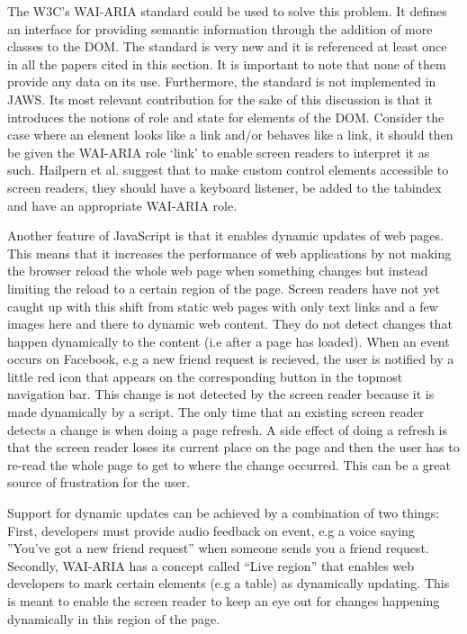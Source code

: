 \documentclass[conference]{IEEEtran}
\begin{document}
The W3C’s WAI-ARIA standard\cite{ariaspec} could be used to solve this
problem\cite{ariaprimer}.  It defines an interface for providing semantic
information through the addition of more classes to the DOM.  The standard is
very new and it is referenced at least once in all the papers cited in this
section. It is important to note that none of them provide any data on its use.
Furthermore, the standard  is not implemented in JAWS\cite{hailpern2009}.  Its
most relevant contribution for the sake of this discussion is that it
introduces the notions of role and state for elements of the DOM.  Consider the
case where an element looks like a link and/or behaves like a link, it should
then be given the WAI-ARIA role `link' to enable screen readers to interpret it
as such.  Hailpern et al\cite{hailpern2009}.  suggest that to make custom control
elements accessible to screen readers, they should have a keyboard listener, be
added to the tabindex and have an appropriate WAI-ARIA role.

Another feature of JavaScript is that it  enables dynamic updates of web pages.
This means that it increases the performance of web applications by not making
the browser reload the whole web page when something changes but instead
limiting the reload to a certain region of the page. Screen readers have not
yet caught up with this shift from static web pages with only text links and a
few images here and there to dynamic web content. They do not detect changes
that happen dynamically to the content (i.e after a page has
loaded)\cite{hailpern2009}.  When an event occurs on Facebook, e.g a new friend
request is recieved, the user is notified by a little red icon that appears on
the corresponding button in the topmost navigation bar.  This change is not
detected by the screen reader\cite{buzzi2010} because it is made dynamically by
a script.  The only time that an existing screen reader detects a change is
when doing a page refresh. A side effect of doing a refresh is that the screen
reader loses its current place on the page and then the user has to re-read the
whole page to get to where the change occurred. This can be a great source of
frustration for the user.\cite{petrie2004} 

Support for dynamic updates can be achieved by a combination of two
things\cite{hailpern2009}: First, developers must provide audio feedback on
event, e.g a voice saying ''You've got a new friend request'' when someone
sends you a friend request. Secondly, WAI-ARIA has a concept called ``Live
region''\cite{ariaspec} that enables web developers to mark certain elements
(e.g a table) as dynamically updating. This is meant to enable the screen
reader to keep an eye out for changes happening dynamically in this region of
the page.
\end{document}

